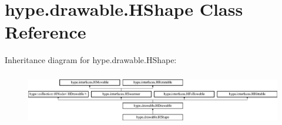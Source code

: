\hypertarget{classhype_1_1drawable_1_1_h_shape}{\section{hype.\-drawable.\-H\-Shape Class Reference}
\label{classhype_1_1drawable_1_1_h_shape}
}
Inheritance diagram for hype.\-drawable.\-H\-Shape\-:\begin{figure}[H]
\begin{center}
\leavevmode
\includegraphics[height=2.333333cm]{classhype_1_1drawable_1_1_h_shape}
\end{center}
\end{figure}

